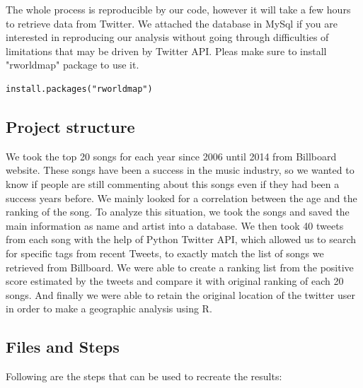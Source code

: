 \documentclass{article}
\begin{document}
The whole process is reproducible by our code, however it will take a few hours to retrieve data from Twitter.  We attached the database in MySql if you are interested in reproducing our analysis without going through difficulties of limitations that may be driven by Twitter API. Pleas make sure to install "rworldmap" package to use it.

\begin{lstlisting}[frame=single]
install.packages("rworldmap")
\end{lstlisting}

\subsection{Project structure}
We took the top 20 songs for each year since 2006 until 2014 from Billboard website. These songs have been a success in the music industry, so we wanted to know if people are still commenting about this songs even if they had been a success years before.  We mainly looked for a correlation between the age and the ranking of the song. To analyze this situation, we took the songs and saved the main information as name and artist into a database.  We then took 40 tweets from each song with the help of Python Twitter API, which allowed us to search for specific tags from recent Tweets, to exactly match the list of songs we retrieved from  Billboard. We were able to create a ranking list from the positive score estimated by the tweets and compare it with original ranking of each 20 songs. And finally we were able to retain the original location of the twitter user in order to make a geographic analysis using R.

\subsection{Files and Steps}
Following are the steps that can be used to recreate the results:
\end{document}
